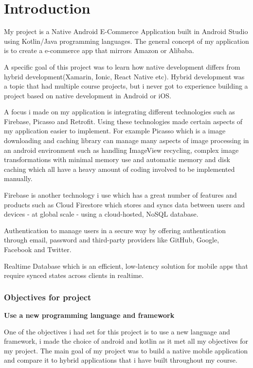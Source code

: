 \chapter{Introduction}
My project is a Native Android E-Commerce Application built in Android Studio using Kotlin/Java programming languages. The general concept of my application is to create a e-commerce app that mirrors Amazon or Alibaba.

A specific goal of this project was to learn how native development differs from hybrid development(Xamarin, Ionic, React Native etc). Hybrid development was a topic that had multiple course projects, but i never got to experience building a project based on native development in Android or iOS.
\newline 

A focus i made on my application is integrating different technologies such as Firebase, Picasso and Retrofit. Using these technologies made certain aspects of my application easier to implement. For example Picasso which is a image downloading and caching library can manage many aspects of image processing in an android environment such as handling ImageView recycling, complex image transformations with minimal memory use and automatic memory and disk caching which all have a heavy amount of coding involved to be implemented manually. \newline

Firebase is another technology i use which has a great number of features and products such as Cloud Firestore which stores and syncs data between users and devices - at global scale - using a cloud-hosted, NoSQL database.

Authentication to manage users in a secure way by offering authentication through email, password and third-party providers like GitHub, Google, Facebook and Twitter.

Realtime Database which is an efficient, low-latency solution for mobile apps that require synced states across clients in realtime.
\newline 



\newpage
\subsection{Objectives for project}

\textbf {Use a new programming language and framework} 

One of the objectives i had set for this project is to use a new language and framework, i made the choice of android and kotlin as it met all my objectives for my project. The main goal of my project was to build a native mobile application and compare it to hybrid applications that i have built throughout my course.\newline


